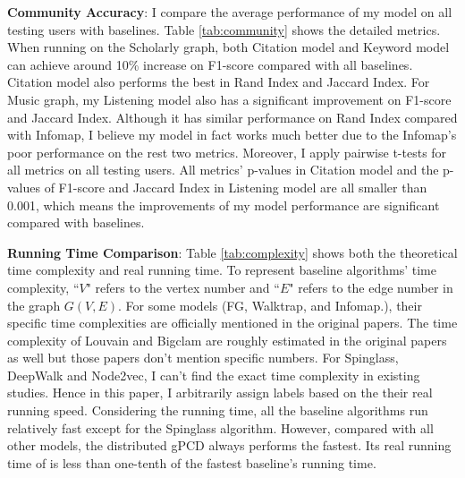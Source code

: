 \textbf{Community Accuracy}: I compare the average performance of my model on all testing users with baselines. Table \ref{tab:community} shows the detailed metrics. When running on the Scholarly graph, both Citation model and Keyword model can achieve around 10\% increase on F1-score compared with all baselines. Citation model also performs the best in Rand Index and Jaccard Index. For Music graph, my Listening model also has a significant improvement on F1-score and Jaccard Index. Although it has similar performance on Rand Index compared with Infomap, I believe my model in fact works much better due to the Infomap's poor performance on the rest two metrics. Moreover, I apply pairwise t-tests for all metrics on all testing users. All metrics' p-values in Citation model and the p-values of F1-score and Jaccard Index in Listening model are all smaller than 0.001, which means the improvements of my model performance are significant compared with baselines.


\textbf{Running Time Comparison}: Table \ref{tab:complexity} shows both the theoretical time complexity and real running time. To represent baseline algorithms' time complexity, ``$V$" refers to the vertex number and ``$E$" refers to the edge number in the graph $G(V,E)$. For some models (FG, Walktrap, and Infomap.), their specific time complexities are officially mentioned in the original papers. The time complexity of Louvain and Bigclam are roughly estimated in the original papers as well but those papers don't mention specific numbers. For Spinglass, DeepWalk and Node2vec, I can't find the exact time complexity in existing studies. Hence in this paper, I arbitrarily assign labels based on the their real running speed. Considering the running time, all the baseline algorithms run relatively fast except for the Spinglass algorithm. However, compared with all other models, the distributed gPCD always performs the fastest. Its real running time of is less than one-tenth of the fastest baseline's running time. 

